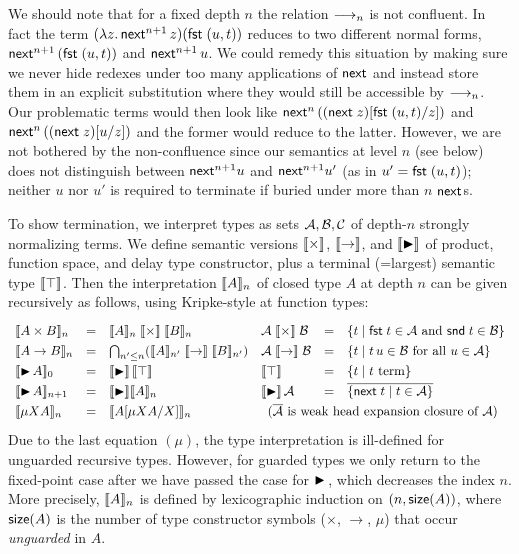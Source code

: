 We should note that for a fixed depth $n$ the relation $\red_n$ is not
confluent. In fact the term $(\lambda z. \, \tnext^{n+1} \, z) (\fst (u , t))$
reduces to two different normal forms, $\tnext^{n+1} \, (\fst (u , t))$ and $\tnext^{n+1} \, u$.
We could remedy this situation by making sure we never hide redexes
under too many applications of $\tnext$ and instead store them in an explicit
substitution where they would still be accessible by $\red_n$.
Our problematic terms would then look like $\tnext^{n} \, (\subst {\fst (u , t)} z {(\pure z)})$
and $\tnext^{n} \, (\subst u z {(\pure z)})$ and the former would reduce
to the latter.
However, we are not bothered by the non-confluence since our semantics
at level $n$ (see below) does not distinguish between $\tnext^{n+1} u$ and
$\tnext^{n+1} u'$ (as in $u' = \fst (u,t)$); neither $u$ nor $u'$ is
required to terminate if buried under more than $n$ $\tnext$s.


To show termination, we interpret types as sets $\A,\B,\C$ of
depth-$n$ strongly normalizing terms.
We define semantic versions $\semtimes$,
$\semto$, and $\semlater$ of product, function space, and delay type
constructor, plus a terminal (=largest) semantic type $\semtop$.  Then
the interpretation $\Den A n$ of closed type $A$ at depth $n$ can be given
recursively as follows, using Kripke-style at function types:
\[
\def\arraystretch{1.3}
\begin{array}{lll@{\quad}lll}
  \Den{A \times B}n & = & \Den A n \semtimes \Den B n
  &
  \A \semtimes \B & = & \{ t \mid \fst t \in \A \mand \snd t \in \B \}
\\
  \Den{A \to B}n & = & \bigcap_{n' \leq n} (\Den A {n'} \semto \Den B {n'})
  &
  \A \semto \B & = & \{ t \mid t\,u \in \B \mforall u \in \A \}
\\
  \Den{\later A}0 & = & \semlater \semtop
  &
  \semtop & = & \{ t \mid t \mbox{ term} \}
\\
  \Den{\later A}{n+1} & = & \semlater \Den A n
  &
  \semlater \A & = & \overline{\{ \pure t \mid t \in \A \}}
\\
  \Den{\mu X A}n & = & \Den{\subst{\mu X A}X A}n
  &
  \multicolumn 3 l {(\overline\A \mbox{ is weak head expansion closure
      of } \A)}
\\
\end{array}
\]
%
Due to the last equation $(\mu)$, the type interpretation is ill-defined for
unguarded recursive types.  However, for guarded types we only return
to the fixed-point case after we have passed the case for $\later$,
which decreases the index $n$.  More precisely, $\Den A n$ is defined by
lexicographic induction on $(n, \tsize(A))$, where $\tsize(A)$ is the
number of type constructor symbols ($\times$, $\to$, $\mu$)
that occur \emph{unguarded} in $A$.

